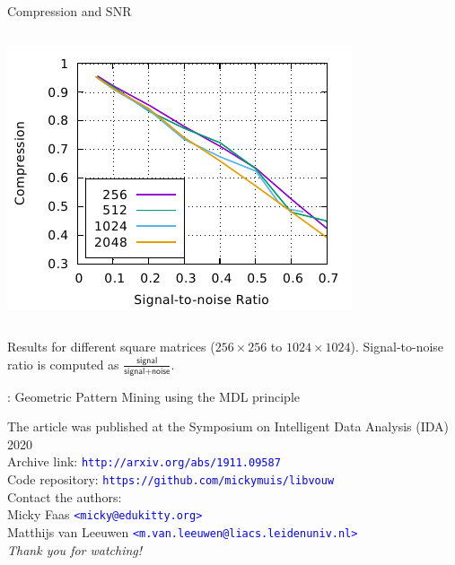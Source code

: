 \documentclass[11pt]{beamer}
\begin{document}

\begin{frame}{Compression and SNR}
\nointerlineskip%
\begin{columns}
\column{\dimexpr\paperwidth}
\centering
\includegraphics[scale=1]{"results_compression"} 
\end{columns}
\bigskip
\small Results for different square matrices ($256 \times 256$ to $1024 \times 1024$). Signal-to-noise ratio is computed as $\frac{\textsf{signal}}{\textsf{signal}+\textsf{noise}}$.

\end{frame}


\begin{frame}{\large: Geometric Pattern Mining using the MDL principle}

\small
The article was published at the Symposium on Intelligent Data Analysis (IDA) 2020\\ \smallskip
Archive link: \texttt{\textcolor{blue}{http://arxiv.org/abs/1911.09587}}\\ \smallskip
Code repository: \texttt{\textcolor{blue}{https://github.com/mickymuis/libvouw}}\\ \smallskip
Contact the authors:\\ \smallskip
Micky Faas \texttt{\textcolor{blue}{<micky@edukitty.org>}}\\ \smallskip
Matthijs van Leeuwen \texttt{\textcolor{blue}{<m.van.leeuwen@liacs.leidenuniv.nl>}}\\ \bigskip
\emph{Thank you for watching!}



\end{frame}
\end{document}
